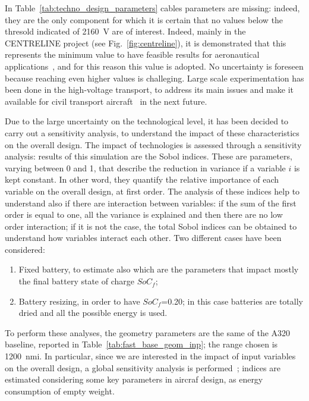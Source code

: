In Table~\ref{tab:techno_design_parameters} cables parameters are missing: indeed, they are the only component for which it is certain that no values below the thresold indicated of 2160~\si{\volt} are of interest. 
Indeed, mainly in the CENTRELINE project (see Fig.~\ref{fig:centreline}), it is demonstrated that this represents the minimum value to have feasible results for aeronautical applications~\cite{bib:bijewitz}, and for this reason this value is adopted.
No uncertainty is foreseen because reaching even higher values is challeging. 
Large scale experimentation has been done in the high-voltage transport, to address its main issues and make it available for civil transport aircraft~\cite{bib:xin, bib:armstrong} in the next future. 

Due to the large uncertainty on the technological level, it has been decided to carry out a sensitivity analysis, to understand the impact of these characteristics on the overall design. 
The impact of technologies is assessed through a sensitivity analysis: results of this simulation are the Sobol indices. 
These are parameters, varying between 0 and 1, that describe the reduction in variance if a variable $i$ is kept constant. 
In other word, they quantify the relative importance of each variable on the overall design, at first order. 
The analysis of these indices help to understand also if there are interaction between variables: if the sum of the first order is equal to one, all the variance is explained and then there are no low order interaction; if it is not the case, the total Sobol indices can be obtained to understand how variables interact each other. 
Two different cases have been considered:
\begin{enumerate}
	\item Fixed battery, to estimate also which are the parameters that impact mostly the final battery state of charge $SoC_f$;
	\item Battery resizing, in order to have $SoC_f$=0.20; in this case batteries are totally dried and all the possible energy is used.
\end{enumerate}
To perform these analyses, the geometry parameters are the same of the A320 baseline, reported in Table~\ref{tab:fast_base_geom_inp}; the range chosen is 1200~nmi.
In particular, since we are interested in the impact of input variables on the overall design, a global sensitivity analysis is performed~\cite{bib:saltelli}; indices are estimated considering some key parameters in aircraf design, as energy consumption of empty weight. 

